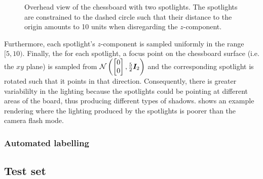 \begin{enumerate}
\begin{figure}
            \caption{Overhead view of the chessboard with two spotlights. The spotlights are constrained to the dashed circle such that their distance to the origin amounts to 10 units when disregarding the $z$-component.}
            \label{fig:chessboard_lighting_circle}
        \end{figure}
        Furthermore, each spotlight's $z$-component is sampled uniformly in the range $[5, 10)$.
        Finally, the for each spotlight, a focus point on the chessboard surface (i.e. the $xy$ plane) is sampled from
        \(
            \mathcal{N}\left(
                \begin{bmatrix}
                    0 \\ 0
                \end{bmatrix},
                \frac{5}{2} {\bm{I}}_2
            \right)
        \)
        and the corresponding spotlight is rotated such that it points in that direction.
        Consequently, there is greater variabililty in the lighting because the spotlights could be pointing at different areas of the board, thus producing different types of shadows.
         shows an example rendering where the lighting produced by the spotlights is poorer than the camera flash mode.
\end{enumerate}

\subsubsection{Automated labelling}

\subsection{Test set}